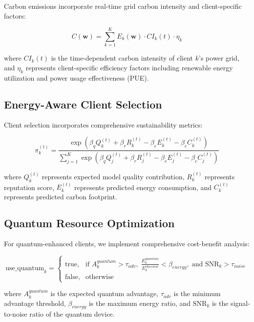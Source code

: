 \documentclass[10pt,journal,compsoc]{IEEEtran}
\newcommand{\vect}[1]{\mathbf{#1}}
\begin{document}
Carbon emissions incorporate real-time grid carbon intensity and client-specific factors:

\begin{equation}
C(\vect{w}) = \sum_{k=1}^{K} E_k(\vect{w}) \cdot CI_k(t) \cdot \eta_k
\label{eq:carbon_model}
\end{equation}

where $CI_k(t)$ is the time-dependent carbon intensity of client $k$'s power grid, and $\eta_k$ represents client-specific efficiency factors including renewable energy utilization and power usage effectiveness (PUE).

\subsection{Energy-Aware Client Selection}

Client selection incorporates comprehensive sustainability metrics:

\begin{equation}
\pi_k^{(t)} = \frac{\exp\left(\beta_q Q_k^{(t)} + \beta_r R_k^{(t)} - \beta_e E_k^{(t)} - \beta_c C_k^{(t)}\right)}{\sum_{j=1}^K \exp\left(\beta_q Q_j^{(t)} + \beta_r R_j^{(t)} - \beta_e E_j^{(t)} - \beta_c C_j^{(t)}\right)}
\label{eq:sustainable_selection}
\end{equation}

where $Q_k^{(t)}$ represents expected model quality contribution, $R_k^{(t)}$ represents reputation score, $E_k^{(t)}$ represents predicted energy consumption, and $C_k^{(t)}$ represents predicted carbon footprint.

\subsection{Quantum Resource Optimization}

For quantum-enhanced clients, we implement comprehensive cost-benefit analysis:

\begin{equation}
\text{use\_quantum}_k =
\begin{cases}
\text{true}, & \text{if } A_k^{quantum}>\tau_{adv},\; \frac{E_k^{quantum}}{E_k^{classical}}<\beta_{energy},\; \text{and } \text{SNR}_k>\tau_{noise} \\
\text{false}, & \text{otherwise}
\end{cases}
\label{eq:quantum_decision}
\end{equation}

where $A_k^{quantum}$ is the expected quantum advantage, $\tau_{adv}$ is the minimum advantage threshold, $\beta_{energy}$ is the maximum energy ratio, and $\text{SNR}_k$ is the signal-to-noise ratio of the quantum device.
\end{document}
